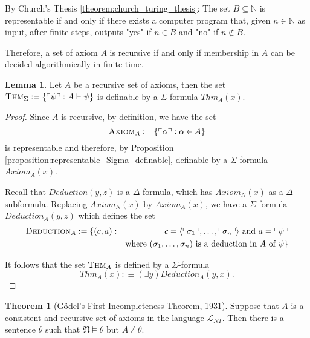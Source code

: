\documentclass[11pt,letterpaper]{book}
\theoremstyle{definition}
\newtheorem{theorem}{Theorem}[section]
\newtheorem{lemma}{Lemma}[section]
\begin{document}
By Church's Thesis \ref{theorem:church_turing_thesis}: The set $B \subseteq \mathbb{N}$ is representable if and only if there exists a computer program that, given $n \in \mathbb{N} $ as input, after finite steps, outputs "yes" if $n \in B$ and "no" if $n \not \in B$.

Therefore, a set of axiom $A$ is recursive if and only if membership in $A$ can be decided algorithmically in finite time.

\begin{lemma}
Let $A$ be a recursive set of axioms, then the set $\text{\textsc{Thm}}_{\Sigma} : = \{ \ulcorner \psi \urcorner : A \vdash \psi \}$ is definable by a $\Sigma$-formula $Thm_A(x)$. 
\end{lemma}

\begin{proof}
Since $A$ is recursive, by definition, we have the set
$$ \text{\textsc{Axiom}}_A := \{ \ulcorner \alpha \urcorner  : \alpha \in A\} $$
is representable and therefore, by Proposition \ref{proposition:representable_Sigma_definable}, definable by a $\Sigma$-formula $Axiom_A (x)$.

Recall that $Deduction(y, z)$ is a $\Delta$-formula, which has $Axiom_N (x)$ as a $\Delta$-subformula. Replacing $Axiom_N (x)$ by $Axiom_A (x)$, we have a $\Sigma$-formula $Deduction_A (y, z)$ which defines the set
\begin{eqnarray*}
\text{\textsc{Deduction}}_{A} := \{ (c, a) & : & c = \langle \ulcorner \sigma_1 \urcorner , \ldots,  \ulcorner \sigma_n \urcorner  \rangle \text{ and } a = \ulcorner \psi \urcorner \\
& & \text{where $(\sigma_1, \ldots, \sigma_n)$ is a deduction in $A$ of $\psi$}  \} 
\end{eqnarray*}

It follows that the set $\text{\textsc{Thm}}_A$ is defined by a $\Sigma$-formula
$$ Thm_A (x) : \equiv (\exists y) Deduction_A (y, x) .$$

\end{proof}


\begin{theorem}[G\"odel's First Incompleteness Theorem, 1931]
\label{theorem:goedel_first_incompleteness}
Suppose that $A$ is a consistent and recursive set of axioms in the language $\mathcal{L}_{NT}$. Then there is a sentence $\theta$ such that $\mathfrak{N} \models \theta$ but $A \not \vdash \theta$.

\end{theorem}
\end{document}
